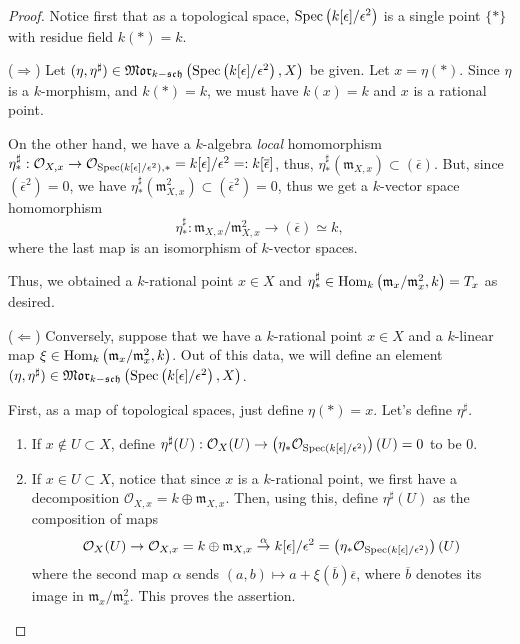 \documentclass[11pt]{amsart}          %
\newcommand{\calO}{\mathcal{O}}
\newcommand{\spec}{{\rm Spec}}
\renewcommand{\hom}{{\rm Hom}}
\begin{document}
\begin{proof} Notice first that as a topological space, $\spec \left( k [ \epsilon]/ \epsilon^2 \right)$ is a single point $\{ * \}$ with residue field $k(*) = k$.

\noindent ($\Rightarrow$) Let $(\eta, \eta^{\sharp}) \in \mathfrak{Mor}_{k-\mathfrak{sch}}\left( \spec \left( k[\epsilon] / \epsilon^2 \right) , X \right)$ be given. Let $x = \eta(*)$. Since $\eta$ is a $k$-morphism, and $k(*) = k$, we must have $k (x) = k$ and $x$ is a rational point.

On the other hand, we have a $k$-algebra {\it local} homomorphism $\eta^{\sharp} _* : \calO_{X, x} \to \calO_{\spec \left( k[\epsilon] / \epsilon^2 \right) , * }  = k [ \epsilon] / \epsilon^2=:k[\overline{\epsilon}]$, thus, $\eta^{\sharp} _* (\mathfrak{m} _{X, x}) \subset (\overline{\epsilon})$. But, since $(\overline{\epsilon}^2) = 0$, we have $\eta^{\sharp} _* ( \mathfrak{m} _{X, x} ^2 ) \subset (\overline{\epsilon}^2) = 0$, thus we get a $k$-vector space homomorphism
$$ \eta^{\sharp} _* : \mathfrak{m}_{X, x} / \mathfrak{m} _{X, x} ^2 \to (\overline{\epsilon})\simeq k,$$ where the last map is an isomorphism of $k$-vector spaces.

Thus, we obtained a $k$-rational point $x\in X$ and $\eta^{\sharp} _* \in \hom_k \left( \mathfrak{m} _x/ \mathfrak{m} _x ^2 , k \right) = T_x$ as desired.

\noindent ($\Leftarrow$) Conversely, suppose that we have a $k$-rational point $x \in X$ and a $k$-linear map $\xi \in \hom_k \left( \mathfrak{m}_x / \mathfrak{m}_x ^2 , k \right)$. Out of this data, we will define an element $(\eta, \eta^{\sharp}) \in \mathfrak{Mor}_{k-\mathfrak{sch}} \left( \spec \left( k [ \epsilon] / \epsilon^2 \right), X \right)$.

First, as a map of topological spaces, just define $\eta (*) = x$. Let's define $\eta^{\sharp}$.
\begin{enumerate}
\item [ ] If $x \not \in U \subset X$, define $\eta^{\sharp} (U) : \calO_X (U) \to \left( \eta_* \calO_{\spec \left( k [\epsilon] /\epsilon^2 \right)} \right)(U) = 0$ to be $0$.

\item [ ]If $x \in U \subset X$, notice that since $x$ is a $k$-rational point, we first have a decomposition $\calO_{X, x} = k \oplus \mathfrak{m}_{X, x}$. Then, using this, define $\eta^{\sharp} (U)$ as the composition of maps
$$\calO_X (U) \to \calO_{X, x} = k \oplus \mathfrak{m}_{X, x}\overset{\alpha}{\to} k[\epsilon] / \epsilon^2 = \left( \eta_* \calO_{\spec \left( k[\epsilon] / \epsilon^2 \right) }\right) (U)$$ where the second map $\alpha$ sends $(a,b) \mapsto a + \xi (\overline{b}) \overline{\epsilon}$, where $\overline{b}$ denotes its image in $\mathfrak{m}_x / \mathfrak{m}_{x} ^2$. This proves the assertion.\end{enumerate}\end{proof}
\end{document}
